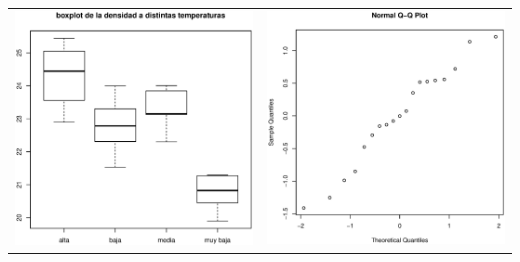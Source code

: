 \documentclass[11pt,a4paper,twoside]{article}%
\begin{document}
{
\begin{tabular}[c]{cc}%
\includegraphics[scale=0.5]{anovaboxplots.eps} &
\includegraphics[scale=0.5]{anovaqqplots.eps}
\end{tabular}
}
\end{document}
